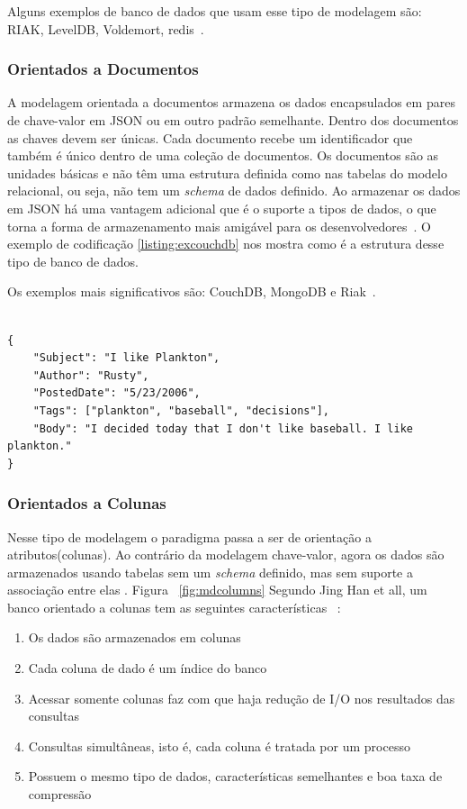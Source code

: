 Alguns exemplos de banco de dados que usam esse tipo de modelagem são: RIAK, LevelDB, Voldemort, redis~\cite{nosqldatabaseorg}.

\subsubsection{Orientados a Documentos}

A modelagem orientada a documentos armazena os dados encapsulados em pares de chave-valor em JSON ou em outro padrão semelhante. Dentro dos documentos as chaves devem ser únicas. Cada documento recebe um identificador que também é único dentro de uma coleção de documentos. Os documentos são as unidades básicas e não têm uma estrutura definida como nas tabelas do modelo relacional, ou seja, não tem um \textit{schema} de dados definido. Ao armazenar os dados em JSON há uma vantagem adicional que é o suporte a tipos de dados, o que torna a forma de armazenamento mais amigável para os desenvolvedores~\cite{nosqlevaluation,nosqlxrelacional}. O exemplo de codificação \ref{listing:excouchdb} nos mostra como é a estrutura desse tipo de banco de dados.

Os exemplos mais significativos são: CouchDB, MongoDB e Riak~\cite{nosqlevaluation}.

	\begin{lstlisting}[caption=Exemplo de arquivo do CouchDB, frame=trBL,breaklines=true,label=listing:excouchdb]

{
    "Subject": "I like Plankton",
    "Author": "Rusty",
    "PostedDate": "5/23/2006",
    "Tags": ["plankton", "baseball", "decisions"],
    "Body": "I decided today that I don't like baseball. I like plankton."
}
	\end{lstlisting}

\subsubsection{Orientados a Colunas}

Nesse tipo de modelagem o paradigma passa a ser de orientação a atributos(colunas). Ao contrário da modelagem chave-valor, agora os dados são armazenados usando tabelas sem um \textit{schema} definido, mas sem suporte a associação entre elas . Figura ~\ref{fig:mdcolumns} Segundo Jing Han et all, um banco orientado a colunas tem as seguintes características ~\cite{surveynosql}:


\begin{enumerate}
\item{Os dados são armazenados em colunas}
\item{Cada coluna de dado é um índice do banco}
\item{Acessar somente colunas faz com que haja redução de I/O nos resultados das consultas}
\item{Consultas simultâneas, isto é, cada coluna é tratada por um processo}
\item{Possuem o mesmo tipo de dados, características semelhantes e boa taxa de compressão}
\end{enumerate}

